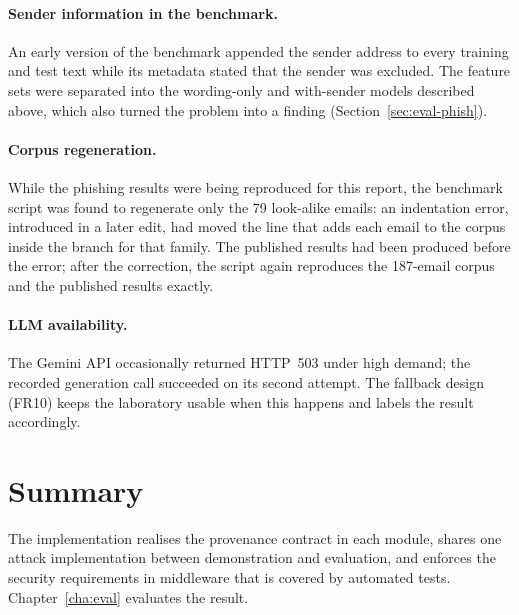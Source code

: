 \paragraph{Sender information in the benchmark.} An early version of the benchmark appended the sender address to every training and test text while its metadata stated that the sender was excluded. The feature sets were separated into the wording-only and with-sender models described above, which also turned the problem into a finding (Section~\ref{sec:eval-phish}).

\paragraph{Corpus regeneration.} While the phishing results were being reproduced for this report, the benchmark script was found to regenerate only the 79 look-alike emails: an indentation error, introduced in a later edit, had moved the line that adds each email to the corpus inside the branch for that family. The published results had been produced before the error; after the correction, the script again reproduces the 187-email corpus and the published results exactly.

\paragraph{LLM availability.} The Gemini API occasionally returned HTTP~503 under high demand; the recorded generation call succeeded on its second attempt. The fallback design (FR10) keeps the laboratory usable when this happens and labels the result accordingly.

\section{Summary}

The implementation realises the provenance contract in each module, shares one attack implementation between demonstration and evaluation, and enforces the security requirements in middleware that is covered by automated tests. Chapter~\ref{cha:eval} evaluates the result.
